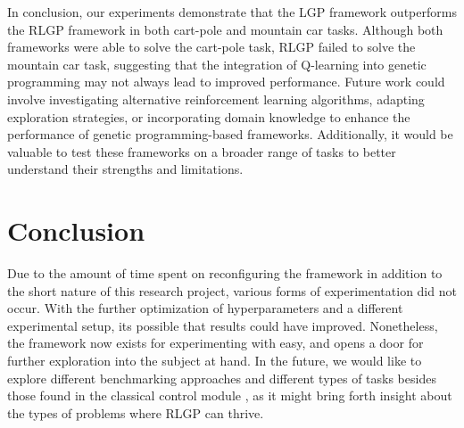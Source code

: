 \documentclass[12pt]{report}
\begin{document}
In conclusion, our experiments demonstrate that the LGP framework outperforms the RLGP framework in both cart-pole and mountain car tasks. Although both frameworks were able to solve the cart-pole task, RLGP failed to solve the mountain car task, suggesting that the integration of Q-learning into genetic programming may not always lead to improved performance. Future work could involve investigating alternative reinforcement learning algorithms, adapting exploration strategies, or incorporating domain knowledge to enhance the performance of genetic programming-based frameworks. Additionally, it would be valuable to test these frameworks on a broader range of tasks to better understand their strengths and limitations.









\chapter{Conclusion}

Due to the amount of time spent on reconfiguring the framework in addition to the short nature of this research project,
various forms of experimentation did not occur. With the further optimization of hyperparameters and a different experimental setup, its possible that results could have improved. Nonetheless, the framework now exists for experimenting with easy, and opens a door for further exploration into the subject at hand. In the future, we would like to
explore different benchmarking approaches and different types of tasks besides those found in the classical control module \cite{1606.01540}, as it might bring forth insight about the types of problems where RLGP can thrive.


\nocite{*}

\end{document}
